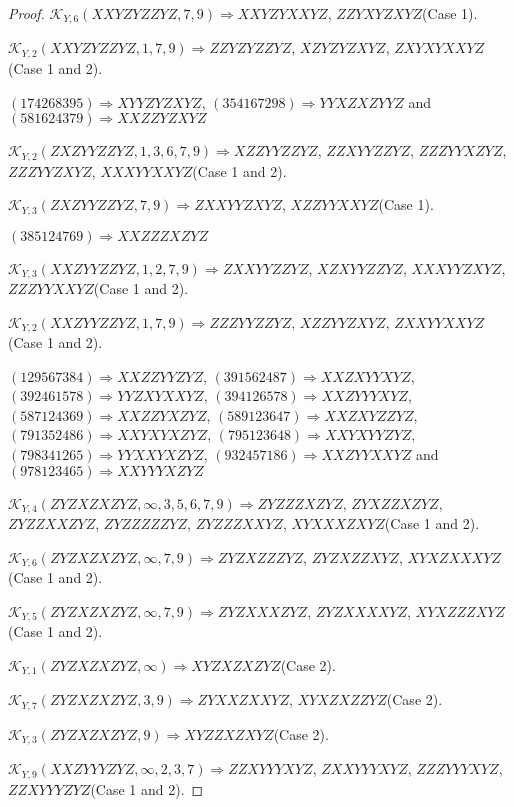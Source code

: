 \documentclass[12pt]{article}
\theoremstyle{plain}
\theoremstyle{definition}
\theoremstyle{remark}
\newcommand{\fancy}[1]{\mathcal{#1}}
\def\K{\fancy{K}}
\begin{document}
\begin{proof}
	$\K_{Y,6}(XXYZYZZYZ,7, 9)\Rightarrow $$XXYZYXXYZ$, $ZZYXYZXYZ$(Case 1).
	
	$\K_{Y,2}(XXYZYZZYZ,1, 7, 9)\Rightarrow $$ZZYZYZZYZ$, $XZYZYZXYZ$, $ZXYXYXXYZ$(Case 1 and 2).
	
	
	
	$(1 7 4 2 6 8 3 9 5)\Rightarrow XYYZYZXYZ$, $(3 5 4 1 6 7 2 9 8)\Rightarrow YYXZXZYYZ$ and $(5 8 1 6 2 4 3 7 9)\Rightarrow XXZZYZXYZ$
	
	
	$\K_{Y,2}(ZXZYYZZYZ,1, 3, 6, 7, 9)\Rightarrow $$XZZYYZZYZ$, $ZZXYYZZYZ$, $ZZZYYXZYZ$, $ZZZYYZXYZ$, $XXXYYXXYZ$(Case 1 and 2).
	
	$\K_{Y,3}(ZXZYYZZYZ,7, 9)\Rightarrow $$ZXXYYZXYZ$, $XZZYYXXYZ$(Case 1).
	
	
	
	$(3 8 5 1 2 4 7 6 9)\Rightarrow XXZZZXZYZ$
	
	
	$\K_{Y,3}(XXZYYZZYZ,1, 2, 7, 9)\Rightarrow $$ZXXYYZZYZ$, $XZXYYZZYZ$, $XXXYYZXYZ$, $ZZZYYXXYZ$(Case 1 and 2).
	
	$\K_{Y,2}(XXZYYZZYZ,1, 7, 9)\Rightarrow $$ZZZYYZZYZ$, $XZZYYZXYZ$, $ZXXYYXXYZ$(Case 1 and 2).
	
	
	
	$(1 2 9 5 6 7 3 8 4)\Rightarrow XXZZYYZYZ$, $(3 9 1 5 6 2 4 8 7)\Rightarrow XXZXYYXYZ$, $(3 9 2 4 6 1 5 7 8)\Rightarrow YYZXYXXYZ$, $(3 9 4 1 2 6 5 7 8)\Rightarrow XXZYYYXYZ$, $(5 8 7 1 2 4 3 6 9)\Rightarrow XXZZYXZYZ$, $(5 8 9 1 2 3 6 4 7)\Rightarrow XXZXYZZYZ$, $(7 9 1 3 5 2 4 8 6)\Rightarrow XXYXYXZYZ$, $(7 9 5 1 2 3 6 4 8)\Rightarrow XXYXYYZYZ$, $(7 9 8 3 4 1 2 6 5)\Rightarrow YYXXYXZYZ$, $(9 3 2 4 5 7 1 8 6)\Rightarrow XXZYYXXYZ$ and $(9 7 8 1 2 3 4 6 5)\Rightarrow XXYYYXZYZ$
	
	
	$\K_{Y,4}(ZYZXZXZYZ,\infty,3, 5, 6, 7, 9)\Rightarrow $$ZYZZZXZYZ$, $ZYXZZXZYZ$, $ZYZZXXZYZ$, $ZYZZZZZYZ$, $ZYZZZXXYZ$, $XYXXXZXYZ$(Case 1 and 2).
	
	$\K_{Y,6}(ZYZXZXZYZ,\infty,7, 9)\Rightarrow $$ZYZXZZZYZ$, $ZYZXZZXYZ$, $XYXZXXXYZ$(Case 1 and 2).
	
	$\K_{Y,5}(ZYZXZXZYZ,\infty,7, 9)\Rightarrow $$ZYZXXXZYZ$, $ZYZXXXXYZ$, $XYXZZZXYZ$(Case 1 and 2).
	
	$\K_{Y,1}(ZYZXZXZYZ,\infty)\Rightarrow $$XYZXZXZYZ$(Case 2).
	
	$\K_{Y,7}(ZYZXZXZYZ,3, 9)\Rightarrow $$ZYXXZXXYZ$, $XYXZXZZYZ$(Case 2).
	
	$\K_{Y,3}(ZYZXZXZYZ,9)\Rightarrow $$XYZZXZXYZ$(Case 2).
	
	$\K_{Y,9}(XXZYYYZYZ,\infty,2, 3, 7)\Rightarrow $$ZZXYYYXYZ$, $ZXXYYYXYZ$, $ZZZYYYXYZ$, $ZZXYYYZYZ$(Case 1 and 2).
	

\end{proof}
\end{document}
